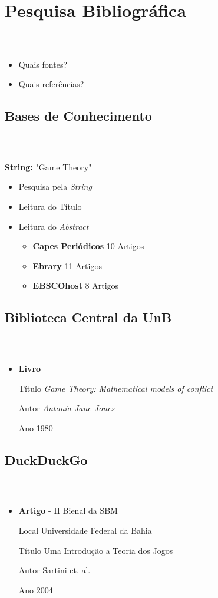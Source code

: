 \section{Pesquisa Bibliográfica}
\begin{frame}
\frametitle{\secname\\\subsecname}
\begin{itemize}
	\item Quais fontes?
	\item Quais referências?
\end{itemize}
\end{frame}

\subsection{Bases de Conhecimento}
\begin{frame}
\frametitle{\secname\\\subsecname}
\textbf{String:} "Game Theory"
\begin{itemize}
\item Pesquisa pela \textit{String}
\item Leitura do Título
\item Leitura do \textit{Abstract}
\begin{itemize}
    \item \textbf{Capes Periódicos} 10 Artigos
    \item \textbf{Ebrary} 11 Artigos
	\item \textbf{EBSCOhost} 8 Artigos
\end{itemize}
\end{itemize}
\end{frame}

\subsection{Biblioteca Central da UnB}
\begin{frame}
\frametitle{\secname\\\subsecname}
\begin{itemize}
	\item \textbf{Livro}
	\item[Título] \emph{Game Theory: Mathematical models of conflict}
	\item[Autor] \emph{Antonia Jane Jones}
	\item[Ano] 1980
\end{itemize}
\end{frame}

\subsection{DuckDuckGo}
\begin{frame}
\frametitle{\secname\\\subsecname}
\begin{itemize}
	\item \textbf{Artigo} - II Bienal da SBM
	\item[Local] Universidade Federal da Bahia
	\item[Título] Uma Introdução a Teoria dos Jogos
	\item[Autor] Sartini et. al.
	\item[Ano] 2004
\end{itemize}
\end{frame}
